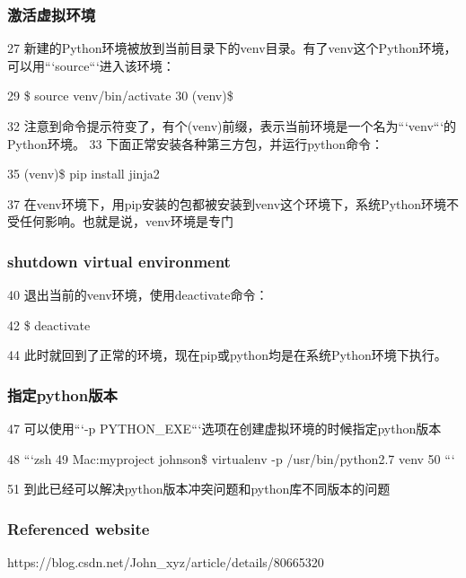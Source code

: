 \documentclass{article} %
\begin{document}
\subsubsection{激活虚拟环境}
 27 新建的Python环境被放到当前目录下的venv目录。有了venv这个Python环境，可以用```source```进入该环境：
 
 29 \$ source venv/bin/activate
 30 (venv)\$

 32 注意到命令提示符变了，有个(venv)前缀，表示当前环境是一个名为```venv```的Python环境。
 33 下面正常安装各种第三方包，并运行python命令：
 
 35 (venv)\$ pip install jinja2

 37 在venv环境下，用pip安装的包都被安装到venv这个环境下，系统Python环境不受任何影响。也就是说，venv环境是专门

\subsubsection{shutdown virtual environment}
 40 退出当前的venv环境，使用deactivate命令：

 42 \$ deactivate

 44 此时就回到了正常的环境，现在pip或python均是在系统Python环境下执行。

\subsubsection{指定python版本}
 47 可以使用```-p PYTHON_EXE```选项在创建虚拟环境的时候指定python版本

 48 ```zsh
 49 Mac:myproject johnson\$ virtualenv -p /usr/bin/python2.7 venv
 50 ```
 
 51 到此已经可以解决python版本冲突问题和python库不同版本的问题
\subsubsection{Referenced website}
 https://blog.csdn.net/John_xyz/article/details/80665320
\end{document}
